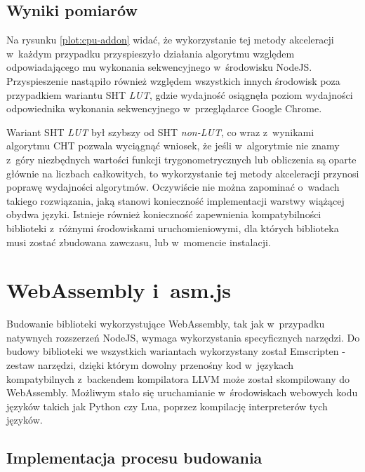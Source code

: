

\subsection{Wyniki pomiarów}

Na rysunku \ref{plot:cpu-addon} widać, że wykorzystanie tej metody akceleracji w~każdym przypadku przyspieszyło działania algorytmu względem odpowiadającego mu wykonania sekwencyjnego w~środowisku NodeJS. Przyspieszenie nastąpiło również względem wszystkich innych środowisk poza przypadkiem wariantu SHT \textit{LUT}, gdzie wydajność osiągnęła poziom wydajności odpowiednika wykonania sekwencyjnego w~przeglądarce Google Chrome.

Wariant SHT \textit{LUT} był  szybszy od SHT \textit{non-LUT}, co wraz z~wynikami algorytmu CHT pozwala wyciągnąć wniosek, że jeśli w~algorytmie nie znamy z~góry niezbędnych wartości funkcji trygonometrycznych lub obliczenia są oparte głównie na liczbach całkowitych, to wykorzystanie tej metody akceleracji przynosi poprawę wydajności algorytmów. Oczywiście nie można zapominać o~wadach takiego rozwiązania, jaką stanowi konieczność implementacji warstwy wiążącej obydwa języki. Istnieje również konieczność zapewnienia kompatybilności biblioteki z~różnymi środowiskami uruchomieniowymi, dla których biblioteka musi zostać zbudowana zawczasu, lub w~momencie instalacji.

\section{WebAssembly i~asm.js}

Budowanie biblioteki wykorzystujące WebAssembly, tak jak w~przypadku natywnych rozszerzeń NodeJS, wymaga wykorzystania specyficznych narzędzi. Do budowy biblioteki we wszystkich wariantach wykorzystany został Emscripten \cite{emscripten} - zestaw narzędzi, dzięki którym dowolny przenośny kod w~językach kompatybilnych z~backendem kompilatora LLVM może został skompilowany do WebAssembly. Możliwym stało się uruchamianie w~środowiskach webowych kodu języków takich jak Python czy Lua, poprzez kompilację interpreterów tych języków.

\subsection{Implementacja procesu budowania}

